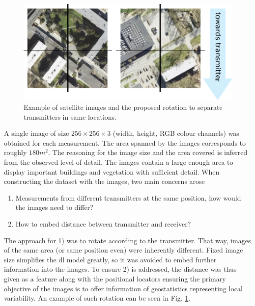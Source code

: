 \begin{figure}[h]
    \centering
    \includegraphics{chapters/part_pathloss/figures/satellite_example.eps}
    \caption{Example of satellite images and the proposed rotation to separate transmitters in same locations.}
    \label{fig:satellite_example}
\end{figure}
A single image of size $256 \times 256 \times 3$ (width, height, RGB colour channels) was obtained for each measurement. The area spanned by the images corresponds to roughly $180 m^2$. The reasoning for the image size and the area covered is inferred from the observed level of detail. The images contain a large enough area to display important buildings and vegetation with sufficient detail. When constructing the dataset with the images, two main concerns arose
\begin{enumerate}

    \item Measurements from different transmitters at the same position, how would the images need to differ?
    \item How to embed distance between transmitter and receiver?
\end{enumerate}

The approach for 1) was to rotate according to the transmitter. That way, images of the same area (or same position even) were inherently different. Fixed image size simplifies the \gls{dl} model greatly, so it was avoided to embed further information into the images. To ensure 2) is addressed, the distance was thus given as a feature along with the positional locators ensuring the primary objective of the images is to offer information of geostatistics representing local variability. An example of such rotation can be seen in Fig. \ref{fig:satellite_example}.





